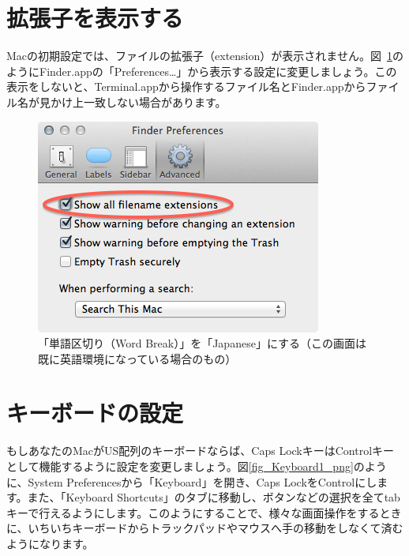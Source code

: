 \section{拡張子を表示する}
Macの初期設定では、ファイルの拡張子（extension）が表示されません。図~\ref{fig_Extension_png}のようにFinder.appの「Preferences\ldots」から表示する設定に変更しましょう。この表示をしないと、Terminal.appから操作するファイル名とFinder.appからファイル名が見かけ上一致しない場合があります。

\begin{figure}
  \begin{center}
    \includegraphics[scale=0.4,bb= 0 0 355 267]{fig/Extension.png}
    \caption{「単語区切り（Word Break）」を「Japanese」にする（この画面は既に英語環境になっている場合のもの）}
    \label{fig_Extension_png}
  \end{center}
\end{figure}

\section{キーボードの設定}

もしあなたのMacがUS配列のキーボードならば、Caps LockキーはControlキーとして機能するように設定を変更しましょう。図\ref{fig_Keyboard1_png}のように、System Preferencesから「Keyboard」を開き、Caps LockをControlにします。また、「Keyboard Shortcuts」のタブに移動し、ボタンなどの選択を全てtabキーで行えるようにします。このようにすることで、様々な画面操作をするときに、いちいちキーボードからトラックパッドやマウスへ手の移動をしなくて済むようになります。

